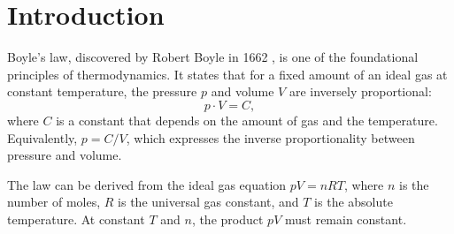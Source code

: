 \documentclass{article}
\theoremstyle{plain}
\theoremstyle{definition}
\theoremstyle{remark}
\begin{document}

\printAffiliationsAndNotice{}

\begin{abstract}
  We present an experimental verification of Boyle's law (1662), which states that
  the pressure of an ideal gas is inversely proportional to its volume at constant
  temperature. Using 12 measurements of pressure and volume at $T = 293.15$ K,
  we confirm the law with a coefficient of determination $R^2 = 0.9993$ and a
  relative standard deviation of the $pV$ product of $1.06\%$. One measurement
  is identified as an outlier via the MAD-based detection method. The fitted
  constant $C = 248.9 \pm 2.6$ kPa$\cdot$L is consistent with the ideal gas
  prediction $C = nRT$.
\end{abstract}

\section{Introduction}

Boyle's law, discovered by Robert Boyle in 1662 \cite{Boyle1662}, is one of the
foundational principles of thermodynamics. It states that for a fixed amount of
an ideal gas at constant temperature, the pressure $p$ and volume $V$ are
inversely proportional:
\begin{equation}
  p \cdot V = C,
\end{equation}
where $C$ is a constant that depends on the amount of gas and the temperature.
Equivalently, $p = C/V$, which expresses the inverse proportionality between
pressure and volume.

The law can be derived from the ideal gas equation $pV = nRT$, where $n$ is the
number of moles, $R$ is the universal gas constant, and $T$ is the absolute
temperature. At constant $T$ and $n$, the product $pV$ must remain constant.
\end{document}
